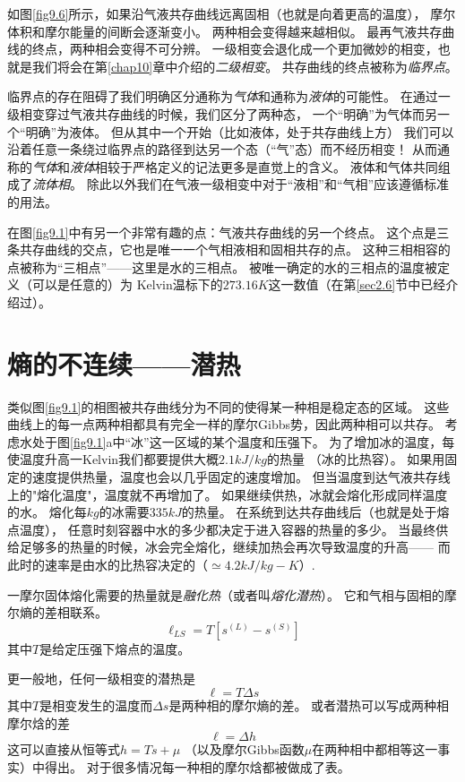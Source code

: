 如图\ref{fig9.6}所示，如果沿气液共存曲线远离固相（也就是向着更高的温度），
摩尔体积和摩尔能量的间断会逐渐变小。
两种相会变得越来越相似。
最再气液共存曲线的终点，两种相会变得不可分辨。
一级相变会退化成一个更加微妙的相变，也就是我们将会在第\ref{chap10}章中介绍的{\it 二级相变}。
共存曲线的终点被称为{\it 临界点}。

临界点的存在阻碍了我们明确区分通称为{\it 气体}和通称为{\it 液体}的可能性。
在通过一级相变穿过气液共存曲线的时候，我们区分了两种态，
一个“明确”为气体而另一个“明确”为液体。
但从其中一个开始（比如液体，处于共存曲线上方）
我们可以沿着任意一条绕过临界点的路径到达另一个态（“气”态）而不经历相变！
从而通称的{\it 气体}和{\it 液体}相较于严格定义的记法更多是直觉上的含义。
液体和气体共同组成了{\it 流体相}。
除此以外我们在气液一级相变中对于“液相”和“气相”应该遵循标准的用法。

在图\ref{fig9.1}中有另一个非常有趣的点：气液共存曲线的另一个终点。
这个点是三条共存曲线的交点，它也是唯一一个气相液相和固相共存的点。
这种三相相容的点被称为“三相点”——这里是水的三相点。
被唯一确定的水的三相点的温度被定义（可以是任意的）为
Kelvin温标下的$273.16K$这一数值（在第\ref{sec2.6}节中已经介绍过）。

\section{熵的不连续——潜热}
\label{sec9.2}

类似图\ref{fig9.1}的相图被共存曲线分为不同的使得某一种相是稳定态的区域。
这些曲线上的每一点两种相都具有完全一样的摩尔Gibbs势，因此两种相可以共存。
考虑水处于图\ref{fig9.1}a中“冰”这一区域的某个温度和压强下。
为了增加冰的温度，每使温度升高一Kelvin我们都要提供大概$2.1kJ/kg$的热量
（冰的比热容）。
如果用固定的速度提供热量，温度也会以几乎固定的速度增加。
但当温度到达气液共存线上的"熔化温度"，温度就不再增加了。
如果继续供热，冰就会熔化形成同样温度的水。
熔化每$kg$的冰需要$335kJ$的热量。
在系统到达共存曲线后（也就是处于熔点温度），
任意时刻容器中水的多少都决定于进入容器的热量的多少。
当最终供给足够多的热量的时候，冰会完全熔化，继续加热会再次导致温度的升高——
而此时的速率是由水的比热容决定的（$\simeq 4.2kJ/kg-K$）.

一摩尔固体熔化需要的热量就是{\it 融化热}（或者叫{\it 熔化潜热}）。
它和气相与固相的摩尔熵的差相联系。
\begin{equation}
\label{equ9.1}
\ell_{LS}=T[s^{(L)}-s^{(S)}]
\end{equation}
其中$T$是给定压强下熔点的温度。

更一般地，任何一级相变的潜热是
\begin{equation}
\label{equ9.2}
\ell=T\Delta s
\end{equation}
其中$T$是相变发生的温度而$\Delta s$是两种相的摩尔熵的差。
或者潜热可以写成两种相摩尔焓的差
\begin{equation}
\label{equ9.3}
\ell=\Delta h
\end{equation}
这可以直接从恒等式$h=Ts+\mu$
（以及摩尔Gibbs函数$\mu$在两种相中都相等这一事实）中得出。
对于很多情况每一种相的摩尔焓都被做成了表。

